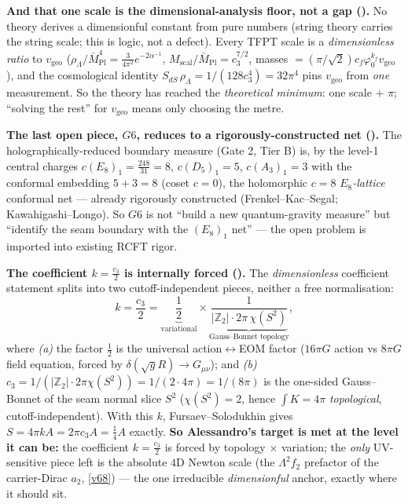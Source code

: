 \documentclass[11pt,a4paper]{article}
\newcommand{\cthree}{c_3}
\newcommand{\phiz}{\varphi_0}
\newcommand{\Z}{\mathbb Z}
\newcommand{\ainv}{\alpha^{-1}}
\begin{document}
\begin{gapbox}
\smallskip\noindent\textbf{And that one scale is the dimensional-analysis floor, not a gap ().}
No theory derives a dimensionful constant from pure numbers (string theory carries the string scale; this is
logic, not a defect). Every TFPT scale is a \emph{dimensionless ratio} to $v_{\mathrm{geo}}$
($\rho_\Lambda/\bar M_{\mathrm{Pl}}^4=\tfrac{3}{4\pi^2}e^{-2\ainv}$, $M_{\mathrm{scal}}/\bar M_{\mathrm{Pl}}=\cthree^{7/2}$,
masses $=(\pi/\sqrt2)c_f\phiz^{k_f}v_{\mathrm{geo}}$), and the cosmological identity
$S_{dS}\,\rho_\Lambda=1/(128\cthree^4)=32\pi^4$ pins $v_{\mathrm{geo}}$ from \emph{one} measurement. So the
theory has reached the \emph{theoretical minimum}: one scale $+$ $\pi$; ``solving the rest'' for $v_{\mathrm{geo}}$
means only choosing the metre.

\smallskip\noindent\textbf{The last open piece, $G6$, reduces to a rigorously-constructed net ().}
The holographically-reduced boundary measure (Gate 2, Tier B) is, by the level-1 central charges
$c(E_8)_1=\tfrac{248}{31}=8$, $c(D_5)_1=5$, $c(A_3)_1=3$ with the conformal embedding $5{+}3=8$ (coset $c=0$), the
holomorphic $c=8$ \emph{$E_8$-lattice} conformal net --- already rigorously constructed (Frenkel--Kac--Segal;
Kawahigashi--Longo). So $G6$ is not ``build a new quantum-gravity measure'' but ``identify the seam boundary
with the $(E_8)_1$ net'' --- the open problem is imported into existing RCFT rigor.

\smallskip\noindent\textbf{The coefficient $k=\tfrac{\cthree}2$ is internally forced ().}
The \emph{dimensionless} coefficient statement splits into two cutoff-independent pieces, neither a free
normalisation:
\[
  k=\frac{\cthree}{2}=\underbrace{\frac12}_{\text{variational}}\times
  \underbrace{\frac{1}{|\Z_2|\cdot 2\pi\,\chi(S^2)}}_{\text{Gauss--Bonnet topology}},
\]
where \emph{(a)} the factor $\tfrac12$ is the universal action$\leftrightarrow$EOM factor
($16\pi G$ action vs $8\pi G$ field equation, forced by $\delta(\sqrt g R)\!\to\!G_{\mu\nu}$); and \emph{(b)}
$\cthree=1/(|\Z_2|\!\cdot\!2\pi\chi(S^2))=1/(2\!\cdot\!4\pi)=1/(8\pi)$ is the one-sided Gauss--Bonnet of the seam
normal slice $S^2$ ($\chi(S^2)=2$, hence $\int K=4\pi$ \emph{topological}, cutoff-independent). With this
$k$, Fursaev--Solodukhin gives $S=4\pi k A=2\pi\cthree A=\tfrac14 A$ exactly. \textbf{So Alessandro's
target is met at the level it can be:} the coefficient $k=\tfrac{\cthree}2$ is forced by topology $\times$
variation; the \emph{only} UV-sensitive piece left is the absolute $4$D Newton scale (the $\Lambda^2 f_2$
prefactor of the carrier-Dirac $a_2$, \vref{v68}) --- the one irreducible \emph{dimensionful} anchor, exactly where
it should sit.


\end{gapbox}
\end{document}
